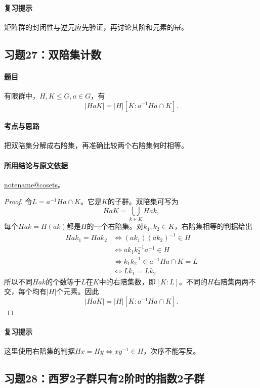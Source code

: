 \documentclass[UTF8,a4paper,11pt,fontset=windows]{ctexart}
\makeatletter
\newcommand{\noteref}[1]{\hyperref[note:#1]{\csname notename@#1\endcsname}}
\newcommand{\exref}[2]{\hyperref[ex:#1:#2]{第#1章习题#2}}
\makeatother
\begin{document}
\paragraph{复习提示}
矩阵群的封闭性与逆元应先验证，再讨论其阶和元素的幂。


\subsection{习题27：\texorpdfstring{双陪集计数}{双陪集计数}}
\label{ex:2:27}

\paragraph{题目}
有限群中，$H,K\leq G,a\in G$，有
\[
|HaK|=|H|[K:a^{-1}Ha\cap K].
\]

\paragraph{考点与思路}
把双陪集分解成右陪集，再准确比较两个右陪集何时相等。

\paragraph{所用结论与原文依据}
\noteref{cosets}。


\begin{proof}
令$L=a^{-1}Ha\cap K$。它是$K$的子群。双陪集可写为
\[
HaK=\bigcup_{k\in K}Hak,
\]
每个$Hak=H(ak)$都是$H$的一个右陪集。对$k_1,k_2\in K$，右陪集相等的判据给出
\begin{align*}
Hak_1=Hak_2
&\iff (ak_1)(ak_2)^{-1}\in H\\
&\iff ak_1k_2^{-1}a^{-1}\in H\\
&\iff k_1k_2^{-1}\in a^{-1}Ha\cap K=L\\
&\iff Lk_1=Lk_2.
\end{align*}
所以不同$Hak$的个数等于$L$在$K$中的右陪集数，即$[K:L]$。不同的$H$右陪集两两不交，每个均有$|H|$个元素。因此
\[
|HaK|=|H|[K:a^{-1}Ha\cap K].
\]
\end{proof}

\paragraph{复习提示}
这里使用右陪集的判据$Hx=Hy\iff xy^{-1}\in H$，次序不能写反。


\subsection{习题28：\texorpdfstring{西罗2子群只有2阶时的指数2子群}{西罗2子群只有2阶时的指数2子群}}
\label{ex:2:28}
\end{document}
